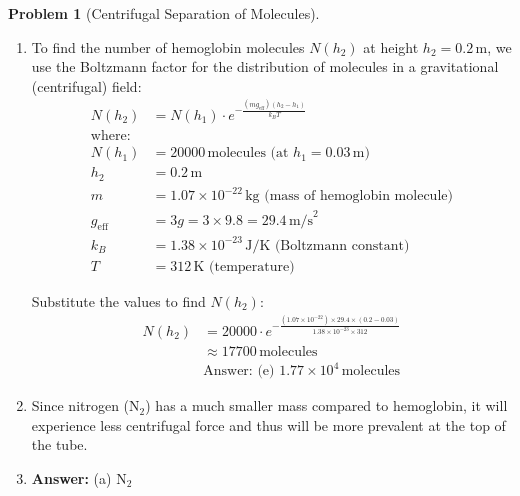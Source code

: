 \documentclass[12pt]{article}
\theoremstyle{definition} %
\newtheorem{problem}{Problem}
\theoremstyle{plain} %
\begin{document}
\begin{problem}[Centrifugal Separation of Molecules]
    \noindent
    \begin{enumerate}
        \item 
        To find the number of hemoglobin molecules \( N(h_2) \) at height \( h_2 = 0.2 \, \text{m} \), we use the Boltzmann factor for the distribution of molecules in a gravitational (centrifugal) field:
        \begin{align*}
        N(h_2) &= N(h_1) \cdot e^{-\frac{(m g_{\text{eff}}) (h_2 - h_1)}{k_B T}} \\
        \text{where:} \\
        N(h_1) &= 20000 \, \text{molecules (at } h_1 = 0.03 \, \text{m)} \\
        h_2 &= 0.2 \, \text{m} \\
        m &= 1.07 \times 10^{-22} \, \text{kg (mass of hemoglobin molecule)} \\
        g_{\text{eff}} &= 3g = 3 \times 9.8 = 29.4 \, \text{m/s}^2 \\
        k_B &= 1.38 \times 10^{-23} \, \text{J/K (Boltzmann constant)} \\
        T &= 312 \, \text{K (temperature)}
        \end{align*}

        Substitute the values to find \( N(h_2) \):
        \begin{align*}
        N(h_2) &= 20000 \cdot e^{-\frac{(1.07 \times 10^{-22}) \times 29.4 \times (0.2 - 0.03)}{1.38 \times 10^{-23} \times 312}} \\
        &\approx 17700 \, \text{molecules} \\
        &\text{Answer: (e) } 1.77 \times 10^4 \, \text{molecules}
        \end{align*}

        \item 
        Since nitrogen (\( \text{N}_2 \)) has a much smaller mass compared to hemoglobin, it will experience less centrifugal force and thus will be more prevalent at the top of the tube.

        \item 
        \textbf{Answer:} (a) \( \text{N}_2 \)
    \end{enumerate}
\end{problem}
\end{document}

